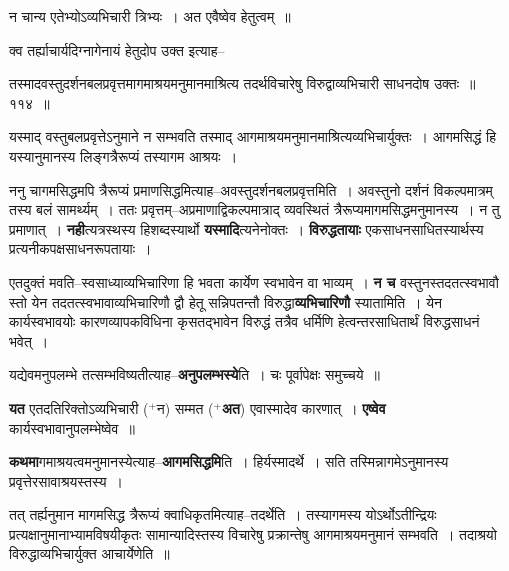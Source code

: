 \documentclass[article,12pt,a4paper]{memoir}
\newcommand{\add}[1]{($^{+}$#1)}
\begin{document}
	न चान्य एतेभ्योऽव्यभिचारी त्रिभ्यः । अत एवैष्वेव हेतुत्वम् ॥  
	  
	क्व तर्ह्याचार्यदिग्नागेनायं हेतुदोप उक्त इत्याह--  
	  
	तस्मादवस्तुदर्शनबलप्रवृत्तमागमाश्रयमनुमानमाश्रित्य तदर्थविचारेषु विरुद्वाव्यभिचारी साधनदोष उक्तः ॥ ११४ ॥ 
	  
	यस्माद् वस्तुबलप्रवृत्तेऽनुमाने न सम्भवति तस्माद् आगमाश्रयमनुमानमाश्रित्यव्यभिचार्युक्तः । आगमसिद्धं हि यस्यानुमानस्य लिङ्गत्रैरूप्यं तस्यागम आश्रयः ।  
	  
	ननु चागमसिद्धमपि त्रैरूप्यं प्रमाणसिद्धमित्याह--अवस्तुदर्शनबलप्रवृत्तमिति । अवस्तुनो दर्शनं विकल्पमात्रम् तस्य बलं सामर्थ्यम् । ततः प्रवृत्तम्--अप्रमाणाद्विकल्पमात्राद् व्यवस्थितं त्रैरूप्यमागमसिद्धमनुमानस्य । न तु प्रमाणात् । \textbf{नही}त्यत्रस्थस्य हिशब्दस्यार्थो \textbf{यस्मादि}त्यनेनोक्तः । \textbf{विरुद्धतायाः} एकसाधनसाधितस्यार्थस्य प्रत्यनीकपक्षसाधनरूपतायाः ।
	\pend
      

	  \pstart एतदुक्तं मवति--स्वसाध्याव्यभिचारिणा हि भवता कार्येण स्वभावेन वा भाव्यम् । \textbf{न च} वस्तुनस्तदतत्स्वभावौ स्तो येन तदतत्स्वभावाव्यभिचारिणौ द्वौ हेतू सन्निपतन्तौ विरुद्धा\textbf{व्यभिचारिणौ} स्यातामिति । येन कार्यस्वभावयोः कारणव्यापकविधिना कृसतद्भावेन विरुद्धं तत्रैव धर्मिणि हेत्वन्तरसाधितार्थं विरुद्धसाधनं भवेत् ।
	\pend
      

	  \pstart यद्येवमनुपलम्भे तत्सम्भविष्यतीत्याह--\textbf{अनुपलम्भस्ये}ति । चः पूर्वापेक्षः समुच्चये ॥
	\pend
      

	  \pstart \textbf{यत} एतदतिरिक्तोऽव्यभिचारी \add{न} सम्मत \add{\textbf{अत}} एवास्मादेव कारणात् । \textbf{एष्वेव} कार्यस्वभावानुपलम्भेष्वेव ॥
	\pend
      

	  \pstart \textbf{कथमा}गमाश्रयत्वमनुमानस्येत्याह--\textbf{आगमसिद्धमि}ति । हिर्यस्मादर्थे । सति तस्मिन्नागमेऽनुमानस्य प्रवृत्तेरसावाश्रयस्तस्य ।
	\pend
	  \bigskip
	  \begingroup
	

	  \pstart तत् तर्ह्यनुमान मागमसिद्ध त्रैरूप्यं क्वाधिकृतमित्याह--तदर्थेति । तस्यागमस्य योऽर्थोऽतीन्द्रियः प्रत्यक्षानुमानाभ्यामविषयीकृतः सामान्यादिस्तस्य विचारेषु प्रक्रान्तेषु आगमाश्रयमनुमानं सम्भवति । तदाश्रयो विरुद्धाव्यभिचार्युक्त आचार्येणेति ॥
	\pend
        
\end{document}
